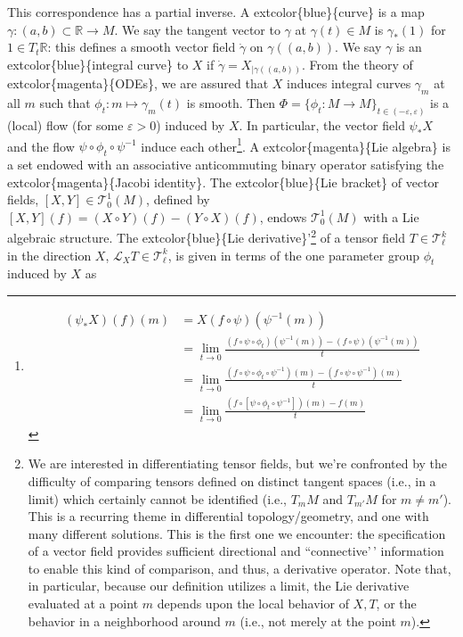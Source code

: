 \documentclass[
]{book}
\begin{document}
This correspondence has a partial inverse. A extcolor\{blue\}\{curve\} is a map \(\gamma : (a,b) \subset \mathbb{R} \to M\). We say the tangent vector to \(\gamma\) at \(\gamma(t) \in M\) is \(\gamma_*(1)\) for \(1 \in T_t \mathbb{R}\): this defines a smooth vector field \(\dot{\gamma}\) on \(\gamma((a,b))\). We say \(\gamma\) is an extcolor\{blue\}\{integral curve\} to \(X\) if \(\dot{\gamma} = X_{|\gamma((a,b))}\). From the theory of extcolor\{magenta\}\{ODEs\}, we are assured that \(X\) induces integral curves \(\gamma_m\) at all \(m\) such that \(\phi_t : m \mapsto \gamma_m(t)\) is smooth. Then \(\Phi = \{\phi_t : M \to M\}_{t\in(-\varepsilon,\varepsilon)}\) is a (local) flow (for some \(\varepsilon > 0\)) induced by \(X\). In particular, the vector field \(\psi_* X\) and the flow \(\psi \circ \phi_t \circ \psi^{-1}\) induce each other\footnote{\begin{align*}
  (\psi_* X)(f)(m) &= X(f \circ \psi)(\psi^{-1}(m)) \\
  &= \lim_{t \to 0}\frac{(f \circ \psi \circ \phi_t)(\psi^{-1}(m)) - (f \circ \psi)(\psi^{-1}(m))}{t} \\
  &= \lim_{t \to 0}\frac{(f \circ \psi \circ \phi_t \circ \psi^{-1})(m) - (f \circ \psi \circ \psi^{-1})(m)}{t} \\
  &= \lim_{t \to 0}\frac{(f \circ [\psi \circ \phi_t \circ \psi^{-1}])(m) - f(m)}{t}
  \end{align*}}. A extcolor\{magenta\}\{Lie algebra\} is a set endowed with an associative anticommuting binary operator satisfying the extcolor\{magenta\}\{Jacobi identity\}. The extcolor\{blue\}\{Lie bracket\} of vector fields, \([X,Y] \in \mathcal{T}_0^1(M)\), defined by \([X,Y](f) = (X \circ Y)(f) - (Y \circ X)(f)\), endows \(\mathcal{T}_0^1(M)\) with a Lie algebraic structure. The extcolor\{blue\}\{Lie derivative\}'\footnote{We are interested in differentiating tensor fields, but we're confronted by the difficulty of comparing tensors defined on distinct tangent spaces (i.e., in a limit) which certainly cannot be identified (i.e., \(T_m M\) and \(T_{m'} M\) for \(m \neq m'\)). This is a recurring theme in differential topology/geometry, and one with many different solutions. This is the first one we encounter: the specification of a vector field provides sufficient directional and ``connective'\,' information to enable this kind of comparison, and thus, a derivative operator. Note that, in particular, because our definition utilizes a limit, the Lie derivative evaluated at a point \(m\) depends upon the local behavior of \(X,T\), or the behavior in a neighborhood around \(m\) (i.e., not merely at the point \(m\)).} of a tensor field \(T \in \mathcal{T}_\ell^k\) in the direction \(X\), \(\mathcal{L}_X T \in \mathcal{T}_\ell^k\), is given in terms of the one parameter group \(\phi_t\) induced by \(X\) as
\end{document}
